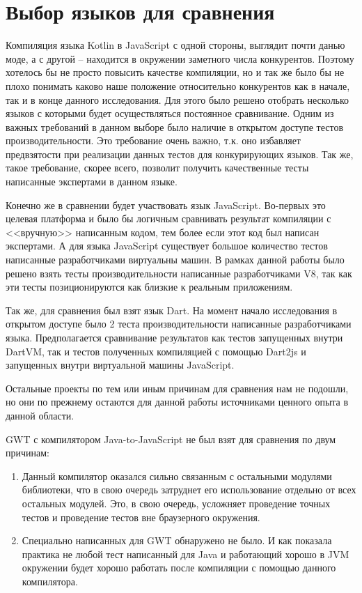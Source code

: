 \section{Выбор языков для сравнения}

Компиляция языка Kotlin в JavaScript с одной стороны, выглядит почти данью моде, а с другой -- находится в окружении заметного числа конкурентов. Поэтому хотелось бы не просто повысить качестве компиляции, но и так же было бы не плохо понимать каково наше положение относительно конкурентов как в начале, так и в конце данного исследования. Для этого было решено отобрать несколько языков с которыми будет осуществляться постоянное сравнивание. Одним из важных требований в данном выборе было наличие в открытом доступе тестов производительности. Это требование очень важно, т.к. оно избавляет предвзятости при реализации данных тестов для конкурирующих языков. Так же, такое требование, скорее всего, позволит получить качественные тесты написанные экспертами в данном языке. 

Конечно же в сравнении будет участвовать язык JavaScript. Во-первых это целевая платформа и было бы логичным сравнивать результат компиляции с <<вручную>> написанным кодом, тем более если этот код был написан экспертами. А для языка JavaScript существует большое количество тестов написанные разработчиками виртуальны машин. В рамках данной работы было решено взять тесты производительности написанные разработчиками V8, так как эти тесты позиционируются как близкие к реальным приложениям.

Так же, для сравнения был взят язык Dart. На момент начало исследования в открытом доступе было 2 теста производительности написанные разработчиками языка. Предполагается сравнивание результатов как тестов запущенных внутри DartVM, так и тестов полученных компиляцией с помощью Dart2js и запущенных внутри виртуальной машины JavaScript.

Остальные проекты по тем или иным причинам для сравнения нам не подошли, но они по прежнему остаются для данной работы источниками ценного опыта в данной области.

GWT с компилятором Java-to-JavaScript не был взят для сравнения по двум причинам:
\begin{enumerate}
\item Данный компилятор оказался сильно связанным с остальными модулями библиотеки, что в свою очередь затруднет его использование отдельно от всех остальных модулей. Это, в свою очередь, усложняет проведение точных тестов и проведение тестов вне браузерного окружения.
\item Специально написанных для GWT обнаружено не было. И как показала практика не любой тест написанный для Java и работающий хорошо в JVM окружении будет хорошо работать после компиляции с помощью данного компилятора.
\end{enumerate}


